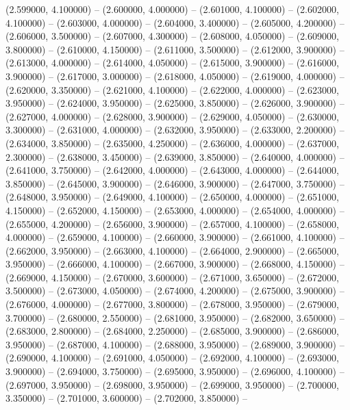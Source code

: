 (2.599000, 4.100000) -- 
(2.600000, 4.000000) -- 
(2.601000, 4.100000) -- 
(2.602000, 4.100000) -- 
(2.603000, 4.000000) -- 
(2.604000, 3.400000) -- 
(2.605000, 4.200000) -- 
(2.606000, 3.500000) -- 
(2.607000, 4.300000) -- 
(2.608000, 4.050000) -- 
(2.609000, 3.800000) -- 
(2.610000, 4.150000) -- 
(2.611000, 3.500000) -- 
(2.612000, 3.900000) -- 
(2.613000, 4.000000) -- 
(2.614000, 4.050000) -- 
(2.615000, 3.900000) -- 
(2.616000, 3.900000) -- 
(2.617000, 3.000000) -- 
(2.618000, 4.050000) -- 
(2.619000, 4.000000) -- 
(2.620000, 3.350000) -- 
(2.621000, 4.100000) -- 
(2.622000, 4.000000) -- 
(2.623000, 3.950000) -- 
(2.624000, 3.950000) -- 
(2.625000, 3.850000) -- 
(2.626000, 3.900000) -- 
(2.627000, 4.000000) -- 
(2.628000, 3.900000) -- 
(2.629000, 4.050000) -- 
(2.630000, 3.300000) -- 
(2.631000, 4.000000) -- 
(2.632000, 3.950000) -- 
(2.633000, 2.200000) -- 
(2.634000, 3.850000) -- 
(2.635000, 4.250000) -- 
(2.636000, 4.000000) -- 
(2.637000, 2.300000) -- 
(2.638000, 3.450000) -- 
(2.639000, 3.850000) -- 
(2.640000, 4.000000) -- 
(2.641000, 3.750000) -- 
(2.642000, 4.000000) -- 
(2.643000, 4.000000) -- 
(2.644000, 3.850000) -- 
(2.645000, 3.900000) -- 
(2.646000, 3.900000) -- 
(2.647000, 3.750000) -- 
(2.648000, 3.950000) -- 
(2.649000, 4.100000) -- 
(2.650000, 4.000000) -- 
(2.651000, 4.150000) -- 
(2.652000, 4.150000) -- 
(2.653000, 4.000000) -- 
(2.654000, 4.000000) -- 
(2.655000, 4.200000) -- 
(2.656000, 3.900000) -- 
(2.657000, 4.100000) -- 
(2.658000, 4.000000) -- 
(2.659000, 4.100000) -- 
(2.660000, 3.900000) -- 
(2.661000, 4.100000) -- 
(2.662000, 3.950000) -- 
(2.663000, 4.100000) -- 
(2.664000, 2.900000) -- 
(2.665000, 3.950000) -- 
(2.666000, 4.100000) -- 
(2.667000, 3.900000) -- 
(2.668000, 4.150000) -- 
(2.669000, 4.150000) -- 
(2.670000, 3.600000) -- 
(2.671000, 3.650000) -- 
(2.672000, 3.500000) -- 
(2.673000, 4.050000) -- 
(2.674000, 4.200000) -- 
(2.675000, 3.900000) -- 
(2.676000, 4.000000) -- 
(2.677000, 3.800000) -- 
(2.678000, 3.950000) -- 
(2.679000, 3.700000) -- 
(2.680000, 2.550000) -- 
(2.681000, 3.950000) -- 
(2.682000, 3.650000) -- 
(2.683000, 2.800000) -- 
(2.684000, 2.250000) -- 
(2.685000, 3.900000) -- 
(2.686000, 3.950000) -- 
(2.687000, 4.100000) -- 
(2.688000, 3.950000) -- 
(2.689000, 3.900000) -- 
(2.690000, 4.100000) -- 
(2.691000, 4.050000) -- 
(2.692000, 4.100000) -- 
(2.693000, 3.900000) -- 
(2.694000, 3.750000) -- 
(2.695000, 3.950000) -- 
(2.696000, 4.100000) -- 
(2.697000, 3.950000) -- 
(2.698000, 3.950000) -- 
(2.699000, 3.950000) -- 
(2.700000, 3.350000) -- 
(2.701000, 3.600000) -- 
(2.702000, 3.850000) -- 
